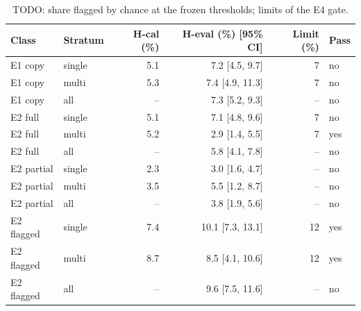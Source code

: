 \begin{table}
\centering
\small
\begin{tabular}{llrrrl}
\toprule
Class & Stratum & H-cal (\%) & H-eval (\%) [95\% CI] & Limit (\%) & Pass \\
\midrule
E1 copy & single & 5.1 & 7.2 [4.5, 9.7] & 7 & no \\
E1 copy & multi & 5.3 & 7.4 [4.9, 11.3] & 7 & no \\
E1 copy & all & -- & 7.3 [5.2, 9.3] & -- & no \\
E2 full & single & 5.1 & 7.1 [4.8, 9.6] & 7 & no \\
E2 full & multi & 5.2 & 2.9 [1.4, 5.5] & 7 & yes \\
E2 full & all & -- & 5.8 [4.1, 7.8] & -- & no \\
E2 partial & single & 2.3 & 3.0 [1.6, 4.7] & -- & no \\
E2 partial & multi & 3.5 & 5.5 [1.2, 8.7] & -- & no \\
E2 partial & all & -- & 3.8 [1.9, 5.6] & -- & no \\
E2 flagged & single & 7.4 & 10.1 [7.3, 13.1] & 12 & yes \\
E2 flagged & multi & 8.7 & 8.5 [4.1, 10.6] & 12 & yes \\
E2 flagged & all & -- & 9.6 [7.5, 11.6] & -- & no \\
\bottomrule
\end{tabular}
\caption{TODO: share flagged by chance at the frozen thresholds; limits of the E4 gate.}
\label{tab:chance_rates}
\end{table}
